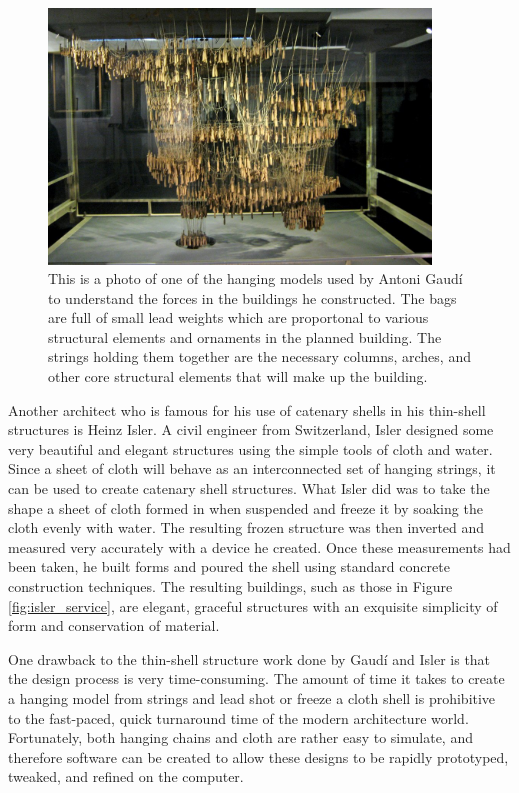 \documentclass{thesis}
\begin{document}
\begin{figure}
\centering
\includegraphics[width=4in]{images/gaudi_model.jpg}
\caption[A hanging model used by Gaud\'{i}]{This is a photo of one of the hanging models used by Antoni Gaud\'{i} to understand the forces in
the buildings he constructed.  The bags are full of small lead weights which are proportonal to various structural elements and ornaments in
the planned building.  The strings holding them together are the necessary columns, arches, and other core structural elements that will make
up the building. \cite{img:gaudi_model}}
\label{fig:gaudi_model}
\end{figure}

Another architect who is famous for his use of catenary shells in his thin-shell structures is Heinz Isler.  A civil engineer from Switzerland,
Isler designed some very beautiful and elegant structures using the simple tools of cloth and water.  Since a sheet of cloth will behave as an
interconnected set of hanging strings, it can be used to create catenary shell structures.  What Isler did was to take the shape a sheet of cloth
formed in when suspended and freeze it by soaking the cloth evenly with water.  The resulting frozen structure was then inverted and measured very
accurately with a device he created.  Once these measurements had been taken, he built forms and poured the shell using standard concrete
construction techniques.  The resulting buildings, such as those in Figure \ref{fig:isler_service}, are elegant, graceful structures with an
exquisite simplicity of form and conservation of material.

One drawback to the thin-shell structure work done by Gaud\'{i} and Isler is that the design process is very time-consuming.  The amount of time
it takes to create a hanging model from strings and lead shot or freeze a cloth shell is prohibitive to the fast-paced, quick turnaround time of
the modern architecture world.  Fortunately, both hanging chains and cloth are rather easy to simulate, and therefore software can be created to
allow these designs to be rapidly prototyped, tweaked, and refined on the computer.
\end{document}
